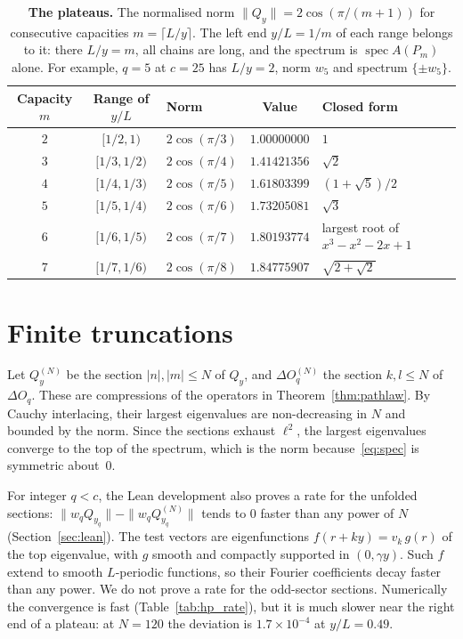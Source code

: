\documentclass[11pt,a4paper]{article}
\theoremstyle{plain}
\theoremstyle{definition}
\theoremstyle{remark}
\newcommand{\spec}{\operatorname{spec}}
\begin{document}
\begin{table}[htbp]
\centering
\small
\caption{\textbf{The plateaus.} The normalised norm $\|Q_y\| = 2\cos(\pi/(m+1))$ for consecutive capacities $m = \lceil L/y\rceil$. The left end $y/L = 1/m$ of each range belongs to it: there $L/y = m$, all chains are long, and the spectrum is $\spec A(P_m)$ alone. For example, $q = 5$ at $c = 25$ has $L/y = 2$, norm $w_5$ and spectrum $\{\pm w_5\}$.}\label{tab:staircase}
\vspace{0.5em}
\begin{tabular}{c c l c l}
\toprule
\textbf{Capacity $m$} & \textbf{Range of $y/L$} & \textbf{Norm} & \textbf{Value} & \textbf{Closed form} \\
\midrule
$2$ & $[1/2, 1)$ & $2\cos(\pi/3)$ & $1.00000000$ & $1$ \\
$3$ & $[1/3, 1/2)$ & $2\cos(\pi/4)$ & $1.41421356$ & $\sqrt{2}$ \\
$4$ & $[1/4, 1/3)$ & $2\cos(\pi/5)$ & $1.61803399$ & $(1+\sqrt{5})/2$ \\
$5$ & $[1/5, 1/4)$ & $2\cos(\pi/6)$ & $1.73205081$ & $\sqrt{3}$ \\
$6$ & $[1/6, 1/5)$ & $2\cos(\pi/7)$ & $1.80193774$ & largest root of $x^3 - x^2 - 2x + 1$ \\
$7$ & $[1/7, 1/6)$ & $2\cos(\pi/8)$ & $1.84775907$ & $\sqrt{2+\sqrt{2}}$ \\
\bottomrule
\end{tabular}
\end{table}

\section{Finite truncations}\label{sec:truncation}

Let $Q_y^{(N)}$ be the section $|n|, |m| \le N$ of $Q_y$, and $\Delta O_q^{(N)}$ the section $k, l \le N$ of $\Delta O_q$. These are compressions of the operators in Theorem~\ref{thm:pathlaw}. By Cauchy interlacing, their largest eigenvalues are non-decreasing in $N$ and bounded by the norm. Since the sections exhaust $\ell^2$, the largest eigenvalues converge to the top of the spectrum, which is the norm because~\eqref{eq:spec} is symmetric about~$0$.

For integer $q < c$, the Lean development also proves a rate for the unfolded sections: $\|w_q Q_{y_q}\| - \|w_q Q_{y_q}^{(N)}\|$ tends to $0$ faster than any power of $N$ (Section~\ref{sec:lean}). The test vectors are eigenfunctions $f(r + ky) = v_k\, g(r)$ of the top eigenvalue, with $g$ smooth and compactly supported in $(0, \gamma y)$. Such $f$ extend to smooth $L$-periodic functions, so their Fourier coefficients decay faster than any power. We do not prove a rate for the odd-sector sections. Numerically the convergence is fast (Table~\ref{tab:hp_rate}), but it is much slower near the right end of a plateau: at $N = 120$ the deviation is $1.7 \times 10^{-4}$ at $y/L = 0.49$.
\end{document}
